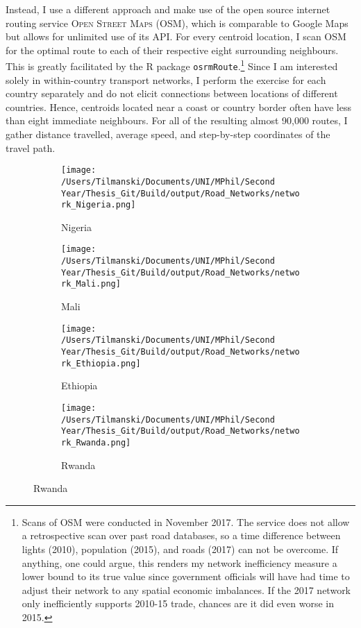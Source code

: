 \documentclass[11pt, oneside]{article}   	%
\begin{document}
Instead, I use a different approach and make use of the open source internet routing service \textsc{Open Street Maps} (OSM), which is comparable to Google Maps but allows for unlimited use of its API. For every centroid location, I scan OSM for the optimal route to each of their respective eight surrounding neighbours. This is greatly facilitated by the R package \texttt{osrmRoute}.\footnote{Scans of OSM were conducted in November 2017. The service does not allow a retrospective scan over past road databases, so a time difference between lights (2010), population (2015), and roads (2017) can not be overcome. If anything, one could argue, this renders my network inefficiency measure a lower bound to its true value since government officials will have had time to adjust their network to any spatial economic imbalances. If the 2017 network only inefficiently supports 2010-15 trade, chances are it did even worse in 2015.} Since I am interested solely in within-country transport networks, I perform the exercise for each country separately and do not elicit connections between locations of different countries. Hence, centroids located near a coast or country border often have less than eight immediate neighbours. For all of the resulting almost 90,000 routes, I gather distance travelled, average speed, and step-by-step coordinates of the travel path.

\begin{figure}[t]
\centering
\caption{Road Networks for different countries as scraped off OSM}

\begin{subfigure}[c]{0.43\textwidth}
\texttt{[image: /Users/Tilmanski/Documents/UNI/MPhil/Second Year/Thesis\_Git/Build/output/Road\_Networks/network\_Nigeria.png]}
\caption{Nigeria}
\label{fig:nigeria_roads}
\end{subfigure}
\begin{subfigure}[c]{0.43\textwidth}
\texttt{[image: /Users/Tilmanski/Documents/UNI/MPhil/Second Year/Thesis\_Git/Build/output/Road\_Networks/network\_Mali.png]}
\caption{Mali}
\label{fig:Mali_roads}
\end{subfigure}

\begin{subfigure}[c]{0.43\textwidth}
\texttt{[image: /Users/Tilmanski/Documents/UNI/MPhil/Second Year/Thesis\_Git/Build/output/Road\_Networks/network\_Ethiopia.png]}
\caption{Ethiopia}
\label{fig:Ethiopia_roads}
\end{subfigure}
\begin{subfigure}[c]{0.43\textwidth}
\texttt{[image: /Users/Tilmanski/Documents/UNI/MPhil/Second Year/Thesis\_Git/Build/output/Road\_Networks/network\_Rwanda.png]}
\caption{Rwanda}
\label{fig:Rwanda_roads}
\end{subfigure}


\label{fig:roads}
\end{figure}
\end{document}
